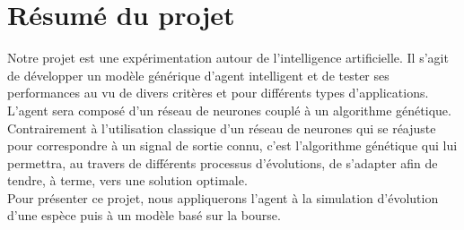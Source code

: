 \chapter{Résumé du projet}
Notre projet est une expérimentation autour de l'intelligence artificielle. Il s'agit de développer un modèle générique d'agent intelligent et de tester ses performances au vu de divers critères et pour différents types d'applications.\\

L'agent sera composé d'un réseau de neurones couplé à un algorithme génétique. Contrairement à l'utilisation classique d'un réseau de neurones qui se réajuste pour correspondre à un signal de sortie connu, c'est l'algorithme génétique qui lui permettra, au travers de différents processus d'évolutions, de s'adapter afin de tendre, à terme, vers une solution optimale.\\
Pour présenter ce projet, nous appliquerons l'agent à la simulation d'évolution d'une espèce puis à un modèle basé sur la bourse.


\clearpage
